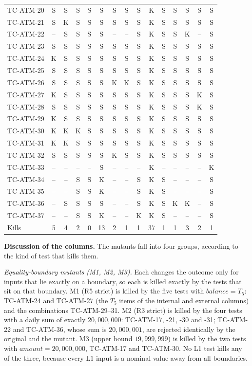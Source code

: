 \documentclass[11pt,a4paper]{article}
\begin{document}
\begin{table}[H]
\begin{tabular}{lcccccccccccccc}
TC-ATM-20 & S & S & S & S & S & S & S & S & K & S & S & S & S & S \\
TC-ATM-21 & S & K & S & S & S & S & S & S & K & S & S & S & S & S \\
TC-ATM-22 & -- & S & S & S & S & -- & -- & S & K & S & S & K & -- & S \\
TC-ATM-23 & S & S & S & S & S & S & S & S & K & S & S & S & S & S \\
TC-ATM-24 & K & S & S & S & S & S & S & S & K & S & S & S & S & S \\
TC-ATM-25 & S & S & S & S & S & S & S & S & K & S & S & S & S & S \\
TC-ATM-26 & S & S & S & S & S & K & K & S & K & S & S & S & S & S \\
TC-ATM-27 & K & S & S & S & S & S & S & S & K & S & S & S & K & S \\
TC-ATM-28 & S & S & S & S & S & S & S & S & K & S & S & S & K & S \\
\midrule
TC-ATM-29 & K & S & S & S & S & S & S & S & K & S & S & S & S & S \\
TC-ATM-30 & K & K & K & S & S & S & S & S & K & S & S & S & S & S \\
TC-ATM-31 & K & K & S & S & S & S & S & S & K & S & S & S & S & S \\
TC-ATM-32 & S & S & S & S & S & K & S & S & K & S & S & S & S & S \\
TC-ATM-33 & -- & -- & -- & -- & S & -- & -- & -- & K & -- & -- & -- & -- & K \\
TC-ATM-34 & -- & -- & S & S & K & -- & -- & S & K & S & -- & -- & -- & S \\
TC-ATM-35 & -- & -- & S & S & K & -- & -- & S & K & S & -- & -- & -- & S \\
TC-ATM-36 & -- & S & S & S & S & -- & -- & S & K & S & K & K & -- & S \\
\midrule
TC-ATM-37 & -- & -- & S & S & K & -- & -- & K & K & S & -- & -- & -- & S \\
\midrule
Kills & 5 & 4 & 2 & 0 & 13 & 2 & 1 & 1 & 37 & 1 & 1 & 3 & 2 & 1 \\
\bottomrule
\end{tabular}
\end{table}

\textbf{Discussion of the columns.} The mutants fall into four groups,
according to the kind of test that kills them.

\emph{Equality-boundary mutants (M1, M2, M3).} Each changes the outcome only
for inputs that lie exactly on a boundary, so each is killed exactly by the
tests that sit on that boundary. M1 (R5 strict) is killed by the five tests
with \(\mathit{balance}=T_5\): TC-ATM-24 and TC-ATM-27 (the \(T_5\) items of
the internal and external columns) and the combinations TC-ATM-29--31. M2
(R3 strict) is killed by the four tests with a daily sum of exactly
\(20{,}000{,}000\): TC-ATM-17, -21, -30 and -31; TC-ATM-22 and TC-ATM-36,
whose sum is \(20{,}000{,}001\), are rejected identically by the original
and the mutant. M3 (upper bound \(19{,}999{,}999\)) is killed by the two
tests with \(\mathit{amount}=20{,}000{,}000\), TC-ATM-17 and TC-ATM-30. No
L1 test kills any of the three, because every L1 input is a nominal value
away from all boundaries.
\end{document}
